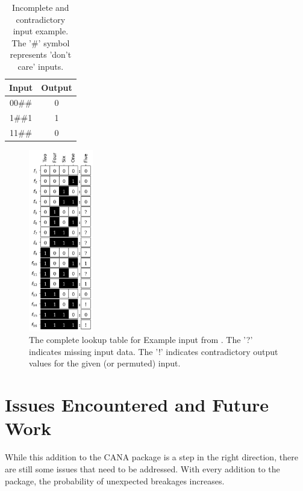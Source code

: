 \documentclass[letterpaper]{article}
\begin{document}
\begin{table}
    \centering
    \begin{tabular}{|c|c|}
        \hline
         Input  & Output \\
        \hline
        00\#\# & 0 \\
        1\#\#1 & 1 \\
        11\#\# & 0 \\
        \hline
    \end{tabular}
    \caption{Incomplete and contradictory input example. The '\#' symbol represents 'don't care' inputs.}
    \label{table:tempynode5-input}
\end{table}


\begin{figure}
    \centering
    \includegraphics[width=0.25\textwidth]{tempynode5lookuptable.png}
    \caption{The complete lookup table for Example input from . The '?' indicates missing input data. The '!' indicates contradictory output values for the given (or permuted) input.}
    \label{fig:tempynode5-lookuptable}
\end{figure}

\section{Issues Encountered and Future Work}
While this addition to the CANA package is a step in the right direction, there are still some issues that need to be addressed. 
With every addition to the package, the probability of unexpected breakages increases. 
\end{document}
